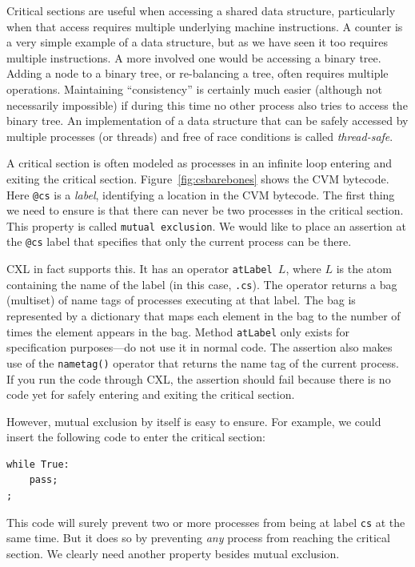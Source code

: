 \documentclass{report}
\newenvironment{code}{
\tcolorbox
}{
\endtcolorbox
}
\begin{document}
Critical sections are useful when accessing a shared data
structure, particularly when that access requires multiple underlying
machine instructions.  A counter is a very simple example of
a data structure, but as we have seen it too requires multiple instructions.
A more involved one would be accessing a binary tree.
Adding a node to a binary tree, or re-balancing a tree, often requires
multiple operations.  Maintaining ``consistency'' is certainly much easier
(although not necessarily impossible) if during this time no other
process also tries to access the binary tree.
An implementation of a data structure that can be safely accessed by multiple
processes (or threads) and free of race conditions is called \emph{thread-safe}.

A critical section is often modeled as processes in an infinite loop
entering and exiting the critical section.
Figure~\ref{fig:csbarebones} shows the CVM bytecode.
Here \texttt{@cs} is a \emph{label},
identifying a location in the CVM bytecode.  The first thing we need to
ensure is that there can never be two processes in the critical section.
This property is called \texttt{mutual exclusion}.
We would like to place an assertion at the \texttt{@cs} label that
specifies that only the current process can be there.

CXL in fact supports this.
It has an operator \texttt{atLabel $L$},
where $L$
is the atom containing the name of the label (in this case, \texttt{.cs}).
The operator returns a bag (multiset) of name tags of processes executing at that
label.  The bag is represented by a dictionary that maps each element
in the bag to the number of times the element appears in the bag.
Method \texttt{atLabel} only exists for specification purposes---do not
use it in normal code.
The assertion also makes use of the \texttt{nametag()} operator
that returns the name tag of the current process.
If you run the code through CXL, the assertion should fail because
there is no code yet for safely entering and exiting the critical section.

However, mutual exclusion by itself is easy to ensure.
For example, we could insert the following code to enter the
critical section:
\begin{code}
\begin{verbatim}
while True:
    pass;
;
\end{verbatim}
\end{code}
This code will surely prevent two or more processes from being
at label \texttt{cs} at the same time.
But it does so by preventing \emph{any} process from reaching
the critical section.
We clearly need another property besides mutual exclusion.
\end{document}
